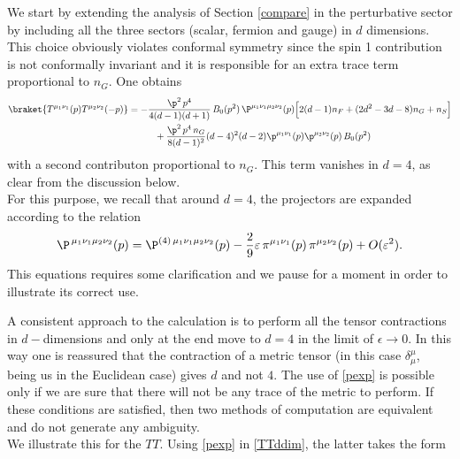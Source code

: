 \documentclass[a4paper,11pt,openright,twoside]{book}
\numberwithin{equation}{section}
\begin{document}
{{We start by extending the analysis of Section \ref{compare} in the perturbative sector by including all the three sectors (scalar, fermion and gauge) in $d$ dimensions. This choice obviously violates conformal symmetry since the spin 1 contribution is not conformally invariant and it is responsible for an extra trace term proportional to $n_G$. One obtains
\begin{align}
	\braket{T^{\mu_1\nu_1}(p)T^{\mu_2\nu_2}(-p)}&=-\frac{\p^2\,p^4}{4(d-1)(d+1)}\,B_0(p^2)\,\P^{\mu_1\nu_1\mu_2\nu_2}(p)\Big[2(d-1)n_F+(2d^2-3d-8)n_G+n_S\Big]\notag\\
	&\hspace{1cm}+\frac{\p^2\,p^4\,n_G}{8(d-1)^2}(d-4)^2(d-2)\p^{\mu_1\nu_1}(p)\p^{\mu_2\nu_2}(p)\,B_0(p^2)\label{TTddim}
\end{align}
with a second contributon proportional to $n_G$. This term vanishes in $d=4$, as clear from the discussion below. \\
For this purpose, we recall that around $d=4$, the projectors are expanded according to the relation 
\begin{equation}
	\label{pexp}
	\P^{\,\mu_1\nu_1\mu_2\nu_2}(p)=\P^{(4)\,\mu_1\nu_1\mu_2\nu_2}(p)-\frac{2}{9}\varepsilon\,\pi^{\mu_1\nu_1}(p)\,\pi^{\mu_2\nu_2}(p)+O(\varepsilon^2). 
\end{equation}
This equations requires some clarification and we pause for a moment in order to illustrate its correct use. 

A consistent approach to the calculation is to perform all the tensor contractions in $d-$dimensions and only at the end move to $d=4$ in the limit of $\epsilon\to 0$. In this way one is reassured that the contraction of a metric tensor (in this case $\delta_{\mu}^{\mu}$, being us in the Euclidean case) gives $d$ and not $4$. The use of \eqref{pexp} is possible only if we are sure that there will not be any trace of the metric to perform. If these conditions are satisfied, then two methods of computation are equivalent and do not generate any ambiguity. \\
We illustrate this for the $TT$. Using \eqref{pexp} in \eqref{TTddim}, the latter takes the form

}}
\end{document}
